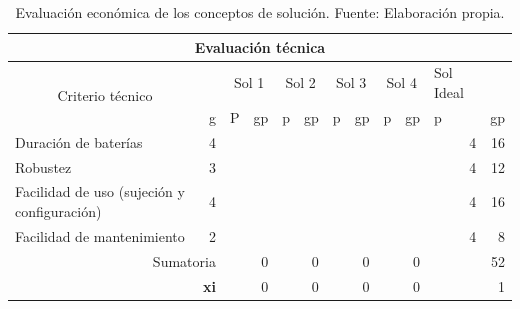 \begin{table}[htbp]
	\centering
	\caption[Evaluación económica de los conceptos de solución.]{Evaluación económica de los conceptos de solución. Fuente: Elaboración propia.}
	\begin{tabular}{|r|r|r|r|r|r|r|r|r|r|r|r|}
		\hline
		\multicolumn{12}{|c|}{Evaluación técnica} \bigstrut\\
		\hline
		\multicolumn{1}{|c|}{\multirow{2}[4]{*}{Criterio técnico}} &       & \multicolumn{2}{c|}{Sol 1} & \multicolumn{2}{c|}{Sol 2} & \multicolumn{2}{c|}{Sol 3} & \multicolumn{2}{c|}{Sol 4} & \multicolumn{1}{l|}{Sol Ideal} &  \bigstrut\\
		\cline{2-12}          & \multicolumn{1}{l|}{g} & \multicolumn{1}{l|}{P} & \multicolumn{1}{l|}{gp} & \multicolumn{1}{l|}{p} & \multicolumn{1}{l|}{gp} & \multicolumn{1}{l|}{p} & \multicolumn{1}{l|}{gp} & \multicolumn{1}{l|}{p} & \multicolumn{1}{l|}{gp} & \multicolumn{1}{l|}{p} & \multicolumn{1}{l|}{gp} \bigstrut\\
		\hline
		\multicolumn{1}{|l|}{Duración de baterías} & 4     &       &       &       &       &       &       &       &       & 4     & 16 \bigstrut\\
		\hline
		\multicolumn{1}{|l|}{Robustez} & 3     &       &       &       &       &       &       &       &       & 4     & 12 \bigstrut\\
		\hline
		\multicolumn{1}{|l|}{Facilidad de uso (sujeción y configuración)} & 4     &       &       &       &       &       &       &       &       & 4     & 16 \bigstrut\\
		\hline
		\multicolumn{1}{|l|}{Facilidad de mantenimiento} & 2     &       &       &       &       &       &       &       &       & 4     & 8 \bigstrut[t]\\
		\multicolumn{2}{|r|}{Sumatoria} &       & 0     &       & 0     &       & 0     &       & 0     &       & 52 \bigstrut[b]\\
		\cline{1-2}\cline{4-4}\cline{6-6}\cline{8-8}\cline{10-10}\cline{12-12}    \multicolumn{2}{|r|}{\textbf{xi}} &       & \cellcolor[rgb]{ .816,  .808,  .808}0 &       & \cellcolor[rgb]{ .816,  .808,  .808}0 &       & \cellcolor[rgb]{ .816,  .808,  .808}0 &       & \cellcolor[rgb]{ .816,  .808,  .808}0 &       & \cellcolor[rgb]{ .816,  .808,  .808}1 \bigstrut\\
		\cline{1-2}\cline{4-4}\cline{6-6}\cline{8-8}\cline{10-10}\cline{12-12}    \end{tabular}%
	\label{tab:eval_economica}%
\end{table}%

